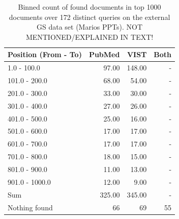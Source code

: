 \documentclass[fleqn,10pt]{wlscirep}
\begin{document}
\begin{table}
\begin{minipage}{0.5\linewidth}
\end{minipage}
\hspace{0.5cm}
\begin{minipage}{0.5\linewidth} 
\begin{tabular}{|l|r|r|r|}
\toprule
 Position (From - To)   &   PubMed &   VIST & Both \\
\hline
 1.0 - 100.0            &    97.00 & 148.00 & - \\
 101.0 - 200.0          &    68.00 &  54.00 & - \\
 201.0 - 300.0          &    33.00 &  30.00 & - \\
 301.0 - 400.0          &    27.00 &  26.00 & - \\
 401.0 - 500.0          &    25.00 &  16.00 & - \\
 501.0 - 600.0          &    17.00 &  17.00 & - \\
 601.0 - 700.0          &    17.00 &  17.00 & - \\
 701.0 - 800.0          &    18.00 &  15.00 & - \\
 801.0 - 900.0          &    11.00 &  13.00 & - \\
 901.0 - 1000.0         &    12.00 &   9.00 & - \\
 \hline
 Sum                    &   325.00 & 345.00 & - \\
 \hline
 Nothing found		& 66 & 69 & 55 \\
\hline
\end{tabular}
\caption{Binned count of found documents in top 1000 documents over 172 distinct queries on the external GS data set (Marios PPTs). NOT MENTIONED/EXPLAINED IN TEXT!}
\label{tab:marios_bins}
\end{minipage}
\end{table}
\end{document}
